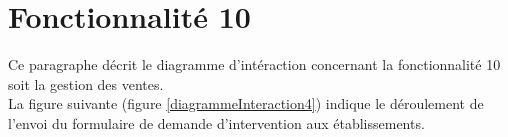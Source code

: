 \section{Fonctionnalité 10}
Ce paragraphe décrit le diagramme d'intéraction concernant la fonctionnalité 10 soit la gestion des ventes. \\

La figure suivante (figure \ref{diagrammeInteraction4}) indique le déroulement de l'envoi du formulaire de demande d'intervention aux établissements.



